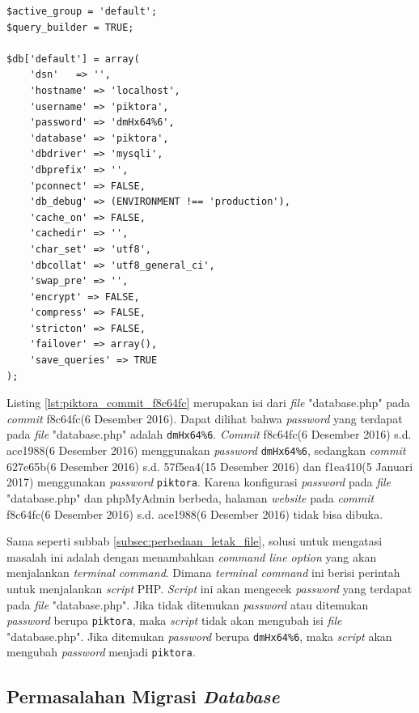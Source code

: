 \begin{lstlisting}[caption={Isi \textit{file} "database.php" pada \textit{commit} f8c64fc(6 Desember 2016)},label={lst:piktora_commit_f8c64fc},language=plaintext]
$active_group = 'default';
$query_builder = TRUE;

$db['default'] = array(
	'dsn'	=> '',
	'hostname' => 'localhost',
	'username' => 'piktora',
	'password' => 'dmHx64%6',
	'database' => 'piktora',
	'dbdriver' => 'mysqli',
	'dbprefix' => '',
	'pconnect' => FALSE,
	'db_debug' => (ENVIRONMENT !== 'production'),
	'cache_on' => FALSE,
	'cachedir' => '',
	'char_set' => 'utf8',
	'dbcollat' => 'utf8_general_ci',
	'swap_pre' => '',
	'encrypt' => FALSE,
	'compress' => FALSE,
	'stricton' => FALSE,
	'failover' => array(),
	'save_queries' => TRUE
);
\end{lstlisting}

Listing \ref{lst:piktora_commit_f8c64fc} merupakan isi dari \textit{file} "database.php" pada \textit{commit} f8c64fc(6 Desember 2016). Dapat dilihat bahwa \textit{password} yang terdapat pada \textit{file} "database.php" adalah \texttt{dmHx64\%6}. \textit{Commit} f8c64fc(6 Desember 2016) s.d. ace1988(6 Desember 2016) menggunakan \textit{password} \texttt{dmHx64\%6}, sedangkan \textit{commit} 627e65b(6 Desember 2016) s.d. 57f5ea4(15 Desember 2016) dan f1ea410(5 Januari 2017) menggunakan \textit{password} \texttt{piktora}. Karena konfigurasi \textit{password} pada \textit{file} "database.php" dan phpMyAdmin berbeda, halaman \textit{website} pada \textit{commit} f8c64fc(6 Desember 2016) s.d. ace1988(6 Desember 2016) tidak bisa dibuka. 

Sama seperti subbab \ref{subsec:perbedaan_letak_file}, solusi untuk mengatasi masalah ini adalah dengan menambahkan \textit{command line option} yang akan menjalankan \textit{terminal command}. Dimana \textit{terminal command} ini berisi perintah untuk menjalankan \textit{script} PHP. \textit{Script} ini akan mengecek \textit{password} yang terdapat pada \textit{file} "database.php". Jika tidak ditemukan \textit{password} atau ditemukan \textit{password} berupa \texttt{piktora}, maka \textit{script} tidak akan mengubah isi \textit{file} "database.php". Jika ditemukan \textit{password} berupa \texttt{dmHx64\%6}, maka \textit{script} akan mengubah \textit{password} menjadi \texttt{piktora}. 

\subsection{Permasalahan Migrasi \textit{Database}}
\label{subsec:migrasi_database}

